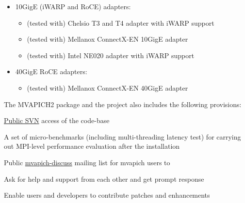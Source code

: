 \begin{itemize}
\begin{itemize}
      \item  10GigE (iWARP and RoCE) adapters:
        \begin{itemize} \item  (tested with) Chelsio T3 and T4 adapter with iWARP support  
          \item  (tested with) Mellanox ConnectX-EN 10GigE adapter 
          \item  (tested with) Intel NE020 adapter with iWARP support 
        \end{itemize}
      
      \item  40GigE RoCE adapters:
        \begin{itemize}
          \item  (tested with) Mellanox ConnectX-EN 40GigE adapter 
        \end{itemize}
    \end{itemize}
  

\end{itemize}

The MVAPICH2 \mvapichversion package and the project also includes the following provisions:

\begin{itemize}
        {\item
        \href{https://scm.nowlab.cse.ohio-state.edu/svn/mpi/mvapich2/} {Public SVN} access of the code-base}
    {\item A set of micro-benchmarks (including multi-threading latency test)
    for carrying out MPI-level performance evaluation after the installation}
    {\item Public \href{http://mailman.cse.ohio-state.edu/mailman/listinfo/mvapich-discuss} {mvapich-discuss} mailing list for mvapich users to
    \begin{itemize}
            {\item Ask for help and support from each other and get prompt response}
        {\item Enable users and developers to contribute patches and enhancements}
    \end{itemize}
    }
\end{itemize}

